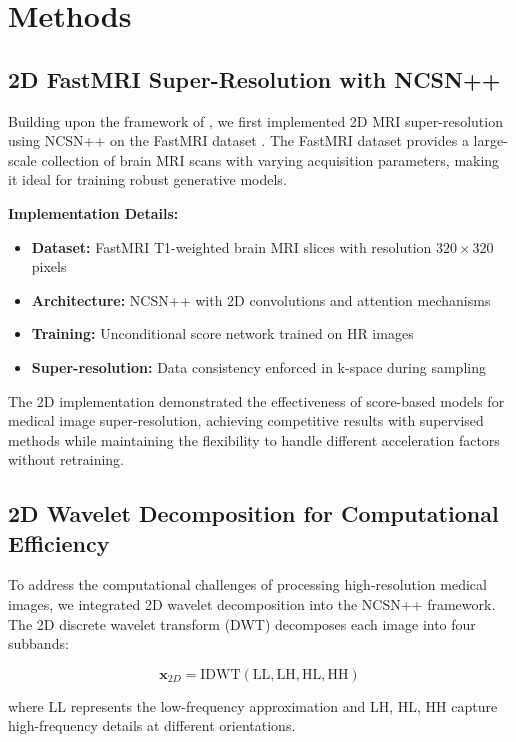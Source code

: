 \documentclass{midl} %
\begin{document}
\section{Methods}

\subsection{2D FastMRI Super-Resolution with NCSN++}

Building upon the framework of \citet{song2021solving}, we first implemented 2D MRI super-resolution using NCSN++ on the FastMRI dataset \citep{fastmri2020}. The FastMRI dataset provides a large-scale collection of brain MRI scans with varying acquisition parameters, making it ideal for training robust generative models.

\textbf{Implementation Details:}
\begin{itemize}
\item \textbf{Dataset:} FastMRI T1-weighted brain MRI slices with resolution $320 \times 320$ pixels
\item \textbf{Architecture:} NCSN++ with 2D convolutions and attention mechanisms
\item \textbf{Training:} Unconditional score network trained on HR images
\item \textbf{Super-resolution:} Data consistency enforced in k-space during sampling
\end{itemize}

The 2D implementation demonstrated the effectiveness of score-based models for medical image super-resolution, achieving competitive results with supervised methods while maintaining the flexibility to handle different acceleration factors without retraining.

\subsection{2D Wavelet Decomposition for Computational Efficiency}

To address the computational challenges of processing high-resolution medical images, we integrated 2D wavelet decomposition into the NCSN++ framework. The 2D discrete wavelet transform (DWT) decomposes each image into four subbands:

\begin{equation}
\mathbf{x}_{2D} = \text{IDWT}(\text{LL}, \text{LH}, \text{HL}, \text{HH})
\end{equation}

where LL represents the low-frequency approximation and LH, HL, HH capture high-frequency details at different orientations.
\end{document}
